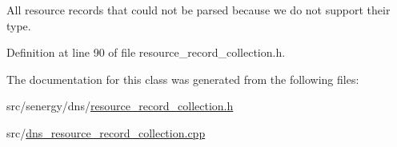 All resource records that could not be parsed because we do not support their type. 



Definition at line 90 of file resource\-\_\-record\-\_\-collection.\-h.



The documentation for this class was generated from the following files\-:\begin{DoxyCompactItemize}
\item 
src/senergy/dns/\hyperlink{resource__record__collection_8h}{resource\-\_\-record\-\_\-collection.\-h}\item 
src/\hyperlink{dns__resource__record__collection_8cpp}{dns\-\_\-resource\-\_\-record\-\_\-collection.\-cpp}\end{DoxyCompactItemize}
